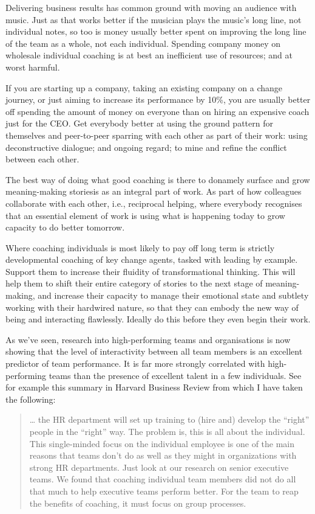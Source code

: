 Delivering business results has common ground with moving an audience with music. Just as that works better if the musician plays the music’s long line, not individual notes, so too is money usually better spent on improving the long line of the team as a whole, not each individual. Spending company money on wholesale individual coaching is at best an inefficient use of resources; and at worst harmful. 


If you are starting up a company, taking an existing company on a change journey, or just aiming to increase its performance by 10\%, you are usually better off spending the amount of money on everyone than on hiring an expensive coach just for the CEO. Get everybody better at using the ground pattern for themselves and peer-to-peer sparring with each other as part of their work: using deconstructive dialogue; and ongoing regard; to mine and refine the conflict between each other.


The best way of doing what good coaching is there to do\textemdash namely surface and grow meaning\hyp{}making stories\textemdash is as an integral part of work. As part of how colleagues collaborate with each other, i.e., reciprocal helping, where everybody recognises that an essential element of work is using what is happening today to grow capacity to do better tomorrow.


Where coaching individuals is most likely to pay off long term is strictly developmental coaching of key change agents, tasked with leading by example. Support them to increase their fluidity of transformational thinking. This will help them to shift their entire category of stories to the next stage of meaning\hyp{}making, and increase their capacity to manage their emotional state and subtlety working with their hardwired nature, so that they can embody the new way of being and interacting flawlessly. Ideally do this before they even begin their work.


As we’ve seen, research into high-performing teams and organisations is now showing that the level of interactivity between all team members is an excellent predictor of team performance. It is far more strongly correlated with high-performing teams than the presence of excellent talent in a few individuals. See for example this summary in Harvard Business Review\cite{coutu-why-teams-dont-work} from which I have taken the following:


\begin{quote}
… the HR department will set up training to (hire and) develop the “right” people in the “right” way. The problem is, this is all about the individual. This single-minded focus on the individual employee is one of the main reasons that teams don’t do as well as they might in organizations with strong HR departments. Just look at our research on senior executive teams. We found that coaching individual team members did not do all that much to help executive teams perform better. For the team to reap the benefits of coaching, it must focus on group processes. 
\end{quote}
